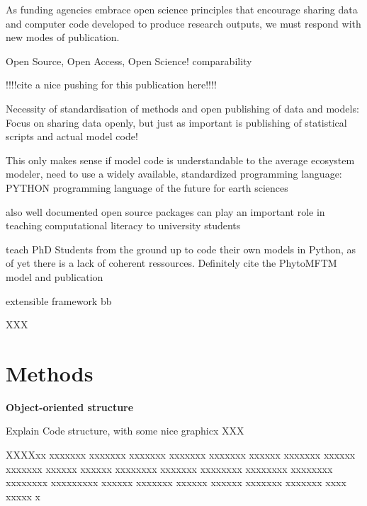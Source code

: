 As funding agencies embrace open science principles that encourage sharing data and computer code developed to produce research outputs, we must respond with new modes of publication.

Open Source, Open Access, Open Science!
comparability

!!!!cite a nice pushing for this publication here!!!!

Necessity of standardisation of methods and open publishing of data and models: \citep{Reichman2011}
Focus on sharing data openly, but just as important is publishing of statistical scripts and actual model code!

This only makes sense if model code is understandable to the average ecosystem modeler, need to use a widely available, standardized programming language:
PYTHON
programming language of the future for earth sciences \citep{Lin2012}

also well documented open source packages can play an important role in teaching computational literacy to university students \citep{Farrell2018}



teach PhD Students from the ground up to code their own models in Python, as of yet there is a lack of coherent ressources. Definitely cite the PhytoMFTM model and publication \citep{AcevedoTrejos2016}

extensible framework
bb



XXX

\section{Methods}



\small {\textbf{Object-oriented structure}}

Explain Code structure, with some nice graphicx
XXX

XXXXxx xxxxxxx xxxxxxx xxxxxxx xxxxxxx xxxxxxx xxxxxx xxxxxxx xxxxxx xxxxxxx xxxxxx xxxxxx xxxxxxxx xxxxxxx xxxxxxxx xxxxxxxx xxxxxxxx xxxxxxxx xxxxxxxxx xxxxxx xxxxxxx xxxxxx xxxxxx xxxxxxx xxxxxxx xxxx xxxxx x

